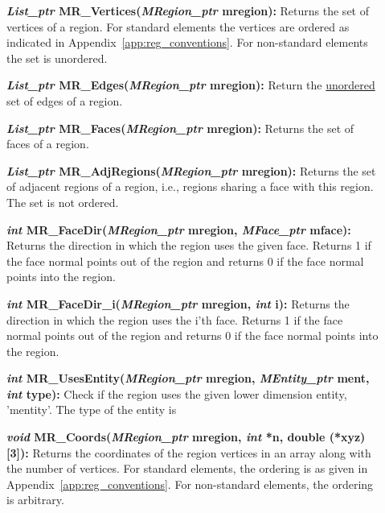 \documentclass[12pt]{article}
\begin{document}
\begin{description}
\item[] 

\item[]\textbf{\textit{List\_ptr} MR\_Vertices(\textit{MRegion\_ptr}
mregion):} Returns the set of vertices of a region. For standard
elements the vertices are ordered as indicated in
Appendix~\ref{app:reg_conventions}. For non-standard elements the set
is unordered.

\item[]\textbf{\textit{List\_ptr} MR\_Edges(\textit{MRegion\_ptr} mregion):}
Return the \underline{unordered} set of edges of a region. 

\item[]\textbf{\textit{List\_ptr} MR\_Faces(\textit{MRegion\_ptr} mregion):}
Returns the set of faces of a region.

\item[]\textbf{\textit{List\_ptr} MR\_AdjRegions(\textit{MRegion\_ptr}
mregion):} Returns the set of adjacent regions of a region, i.e.,
regions sharing a face with this region. The set is not ordered.

\item[]\textbf{\textit{int} MR\_FaceDir(\textit{MRegion\_ptr} mregion,
\textit{MFace\_ptr} mface):} Returns the direction in which the region
uses the given face. Returns 1 if the face normal points out of the
region and returns 0 if the face normal points into the region.

\item[]\textbf{\textit{int} MR\_FaceDir\_i(\textit{MRegion\_ptr} mregion,
\textit{int} i):} Returns the direction in which the region uses the
i'th face. Returns 1 if the face normal points out of the region and
returns 0 if the face normal points into the region.


\item[]

\item[]\textbf{\textit{int} MR\_UsesEntity(\textit{MRegion\_ptr} mregion,
\textit{MEntity\_ptr} ment, \textit{int} type):} Check if the region
uses the given lower dimension entity, 'mentity'. The type of the
entity is

\item[]

\item[]\textbf{\textit{void} MR\_Coords(\textit{MRegion\_ptr} mregion,
\textit{int} *n, double (*xyz)[3]):} Returns the coordinates of the
region vertices in an array along with the number of vertices. For
standard elements, the ordering is as given in
Appendix~\ref{app:reg_conventions}. For non-standard elements, the
ordering is arbitrary.
\end{description}
\end{document}
